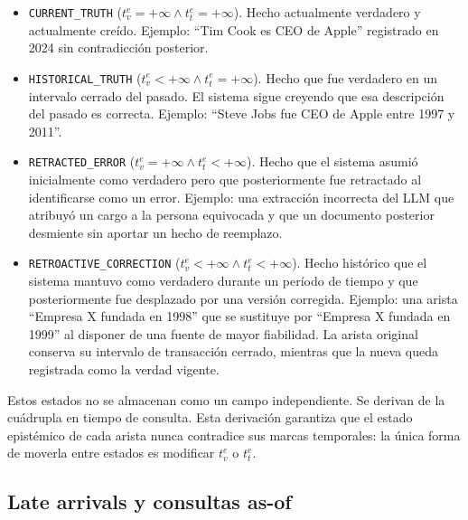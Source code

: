 \begin{itemize}
    \item \texttt{CURRENT\_TRUTH} ($t_v^e = +\infty \wedge t_t^e = +\infty$). Hecho actualmente verdadero y actualmente creído. Ejemplo: ``Tim Cook es CEO de Apple'' registrado en 2024 sin contradicción posterior.
    \item \texttt{HISTORICAL\_TRUTH} ($t_v^e < +\infty \wedge t_t^e = +\infty$). Hecho que fue verdadero en un intervalo cerrado del pasado. El sistema sigue creyendo que esa descripción del pasado es correcta. Ejemplo: ``Steve Jobs fue CEO de Apple entre 1997 y 2011''.
    \item \texttt{RETRACTED\_ERROR} ($t_v^e = +\infty \wedge t_t^e < +\infty$). Hecho que el sistema asumió inicialmente como verdadero pero que posteriormente fue retractado al identificarse como un error. Ejemplo: una extracción incorrecta del LLM que atribuyó un cargo a la persona equivocada y que un documento posterior desmiente sin aportar un hecho de reemplazo.
    \item \texttt{RETROACTIVE\_CORRECTION} ($t_v^e < +\infty \wedge t_t^e < +\infty$). Hecho histórico que el sistema mantuvo como verdadero durante un período de tiempo y que posteriormente fue desplazado por una versión corregida. Ejemplo: una arista ``Empresa X fundada en 1998'' que se sustituye por ``Empresa X fundada en 1999'' al disponer de una fuente de mayor fiabilidad. La arista original conserva su intervalo de transacción cerrado, mientras que la nueva queda registrada como la verdad vigente.
\end{itemize}

Estos estados no se almacenan como un campo independiente. Se derivan de la cuádrupla en tiempo de consulta. Esta derivación garantiza que el estado epistémico de cada arista nunca contradice sus marcas temporales: la única forma de moverla entre estados es modificar $t_v^e$ o $t_t^e$.

\subsection{Late arrivals y consultas as-of}

